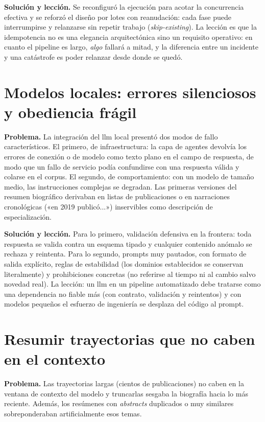 \textbf{Solución y lección.}
Se reconfiguró la ejecución para acotar la concurrencia efectiva y se reforzó el diseño por lotes con reanudación: cada fase puede interrumpirse y relanzarse sin repetir trabajo (\emph{skip-existing}).
La lección es que la idempotencia no es una elegancia arquitectónica sino un requisito operativo: en cuanto el pipeline es largo, \emph{algo} fallará a mitad, y la diferencia entre un incidente y una catástrofe es poder relanzar desde donde se quedó.

\section{Modelos locales: errores silenciosos y obediencia frágil}
\label{sec:lec-llm}

\textbf{Problema.}
La integración del \gls{llm} local presentó dos modos de fallo característicos.
El primero, de infraestructura: la capa de agentes devolvía los errores de conexión o de modelo como texto plano en el campo de respuesta, de modo que un fallo de servicio podía confundirse con una respuesta válida y colarse en el corpus.
El segundo, de comportamiento: con un modelo de tamaño medio, las instrucciones complejas se degradan.
Las primeras versiones del resumen biográfico derivaban en listas de publicaciones o en narraciones cronológicas («en 2019 publicó...») inservibles como descripción de especialización.

\textbf{Solución y lección.}
Para lo primero, validación defensiva en la frontera: toda respuesta se valida contra un esquema tipado y cualquier contenido anómalo se rechaza y reintenta.
Para lo segundo, prompts muy pautados, con formato de salida explícito, reglas de estabilidad (los dominios establecidos se conservan literalmente) y prohibiciones concretas (no referirse al tiempo ni al cambio salvo novedad real).
La lección: un \gls{llm} en un pipeline automatizado debe tratarse como una dependencia no fiable más (con contrato, validación y reintentos) y con modelos pequeños el esfuerzo de ingeniería se desplaza del código al prompt.

\section{Resumir trayectorias que no caben en el contexto}
\label{sec:lec-rolling}

\textbf{Problema.}
Las trayectorias largas (cientos de publicaciones) no caben en la ventana de contexto del modelo y truncarlas sesgaba la biografía hacia lo más reciente.
Además, los resúmenes con \emph{abstracts} duplicados o muy similares sobreponderaban artificialmente esos temas.

